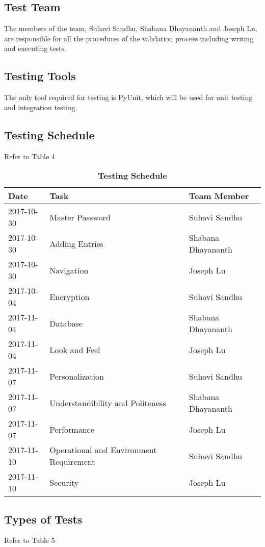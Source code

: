\documentclass[12pt, titlepage]{article}
\begin{document}
\subsection{Test Team}
The members of the team, Suhavi Sandhu, Shabana Dhayananth and Joseph Lu,  are responsible for all the procedures of the validation process including writing and executing tests.

\subsection{Testing Tools}
The only tool required for testing is PyUnit, which will be used for unit testing and integration testing.

\subsection{Testing Schedule}
Refer to Table 4
\begin{table}[!htbp]
    \caption{\textbf{Testing Schedule}} \label{Table}
    \begin{tabularx}{\textwidth}{p{3cm}XX}
        \toprule
        \textbf{Date} & \textbf{Task} & \textbf{Team Member}\\
        \midrule
        2017-10-30 & Master Password & Suhavi Sandhu\\
        2017-10-30 & Adding Entries & Shabana Dhayananth\\
        2017-10-30 & Navigation & Joseph Lu\\
        2017-10-04 & Encryption & Suhavi Sandhu\\
        2017-11-04 & Database & Shabana Dhayananth\\
        2017-11-04 & Look and Feel & Joseph Lu\\
        2017-11-07 & Personalization & Suhavi Sandhu\\
        2017-11-07 & Understandibility and Politeness & Shabana Dhayananth\\
        2017-11-07 & Performance & Joseph Lu\\
        2017-11-10 & Operational and Environment Requirement & Suhavi Sandhu\\
        2017-11-10 & Security & Joseph Lu\\
        \bottomrule
    \end{tabularx}
\end{table}

\subsection{Types of Tests}
Refer to Table 5
\end{document}
